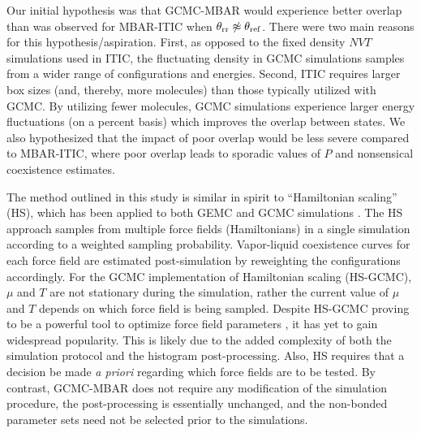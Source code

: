 \documentclass[journal=jced,manuscript=article]{achemso}
\begin{document}

Our initial hypothesis was that GCMC-MBAR would experience better overlap than was observed for MBAR-ITIC when $\theta_{\rm rr} \not\approx \theta_{\rm ref}$. There were two main reasons for this hypothesis/aspiration. First, as opposed to the fixed density $NVT$ simulations used in ITIC, the fluctuating density in GCMC simulations samples from a wider range of configurations and energies. Second, ITIC requires larger box sizes (and, thereby, more molecules) than those typically utilized with GCMC. By utilizing fewer molecules, GCMC simulations experience larger energy fluctuations (on a percent basis) which improves the overlap between states. We also hypothesized that the impact of poor overlap would be less severe compared to MBAR-ITIC, where poor overlap leads to sporadic values of $P$ and nonsensical coexistence estimates.  



The method outlined in this study is similar in spirit to ``Hamiltonian scaling'' (HS), which has been applied to both GEMC \cite{Kiyohara1996} and GCMC simulations \cite{Errington1998,Exp6,Errington1999,Pana2000}. The HS approach samples from multiple force fields (Hamiltonians) in a single simulation according to a weighted sampling probability. Vapor-liquid coexistence curves for each force field are estimated post-simulation by reweighting the configurations accordingly. For the GCMC implementation of Hamiltonian scaling (HS-GCMC), $\mu$ and $T$ are not stationary during the simulation, rather the current value of $\mu$ and $T$ depends on which force field is being sampled. Despite HS-GCMC proving to be a powerful tool to optimize force field parameters \cite{Errington1998,Exp6,Errington1999,Pana2000}, it has yet to gain widespread popularity. This is likely due to the added complexity of both the simulation protocol and the histogram post-processing. Also, HS requires that a decision be made \textit{a priori} regarding which force fields are to be tested. By contrast, GCMC-MBAR does not require any modification of the simulation procedure, the post-processing is essentially unchanged, and the non-bonded parameter sets need not be selected prior to the simulations.
\end{document}
